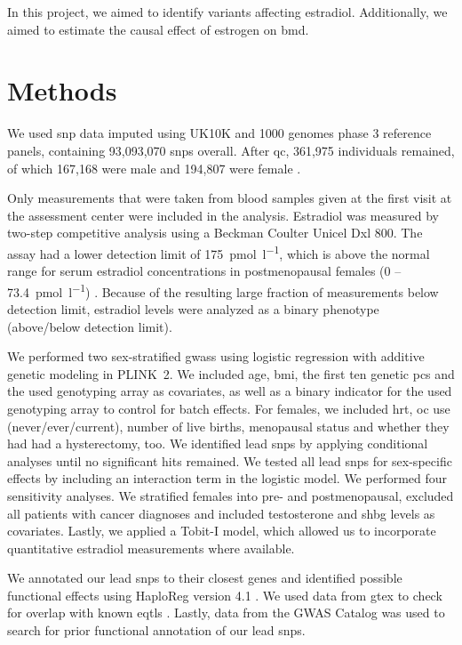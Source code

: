 \documentclass[draft]{scrbook}
\begin{document}
In this project, we aimed to identify variants affecting estradiol.
Additionally, we aimed to estimate the causal effect of estrogen on \gls{bmd}.

\section{Methods} \label{sec:p1methods}
We used \gls{snp} data imputed using UK10K and 1000 genomes phase 3 reference panels, containing 93,093,070 \glspl{snp} overall.
After \gls{qc}, 361,975 individuals remained, of which 167,168 were male and 194,807 were female \cite{Schmitz2021}.

Only measurements that were taken from blood samples given at the first visit at the assessment center were included in the analysis.
Estradiol was measured by two-step competitive analysis using a Beckman Coulter Unicel Dxl 800.
The assay had a lower detection limit of \qty{175}{\pmol\per\litre}, which is above the normal range for serum estradiol concentrations in postmenopausal females (0 -- \qty{73.4}{\pmol\per\litre}) \cite{Nakamoto2010a}.
Because of the resulting large fraction of measurements below detection limit, estradiol levels were analyzed as a binary phenotype (above/below detection limit).

We performed two sex-stratified \glspl{gwas} using logistic regression with additive genetic modeling in \textsf{PLINK~2}.
We included age, \gls{bmi}, the first ten genetic \glspl{pc} and the used genotyping array as covariates, as well as a binary indicator for the used genotyping array to control for batch effects.
For females, we included \gls{hrt}, \gls{oc} use (never/ever/current), number of live births, menopausal status and whether they had had a hysterectomy, too.
We identified lead \glspl{snp} by applying conditional analyses until no significant hits remained.
We tested all lead \glspl{snp} for sex-specific effects by including an interaction term in the logistic model.
We performed four sensitivity analyses.
We stratified females into pre- and postmenopausal, excluded all patients with cancer diagnoses and included testosterone and \gls{shbg} levels as covariates.
Lastly, we applied a Tobit-I model, which allowed us to incorporate quantitative estradiol measurements where available.

We annotated our lead \glspl{snp} to their closest genes and identified possible functional effects using \textsf{HaploReg} version 4.1 \cite{Ward2012}.
We used data from \gls{gtex} to check for overlap with known \glspl{eqtl} \cite{Carithers2015}.
Lastly, data from the GWAS Catalog was used to search for prior functional annotation of our lead \glspl{snp}.
\end{document}
